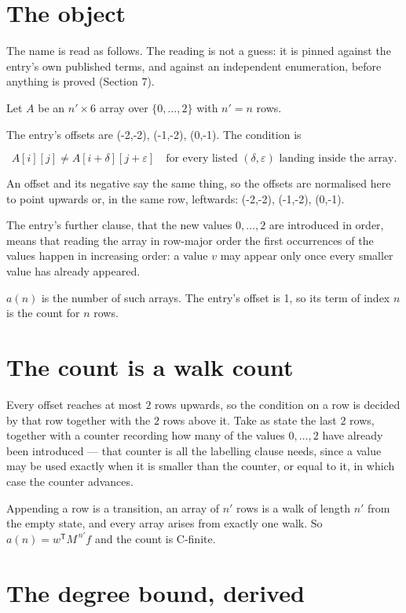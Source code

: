 \documentclass[11pt]{article}
\theoremstyle{definition}
\begin{document}
\section{The object}

The name is read as follows. The reading is not a guess: it is pinned against the entry's own published terms, and against an independent enumeration, before anything is proved (Section 7).

Let $A$ be an $n' \times 6$ array over $\{0,\dots,2\}$ with $n' = n$ rows.

The entry's offsets are (-2,-2), (-1,-2), (0,-1). The condition is

\[A[i][j] \ne A[i{+}\delta][j{+}\varepsilon]\quad\text{for every listed }(\delta,\varepsilon)\text{ landing inside the array.}\]

An offset and its negative say the same thing, so the offsets are normalised here to point upwards or, in the same row, leftwards: (-2,-2), (-1,-2), (0,-1).

The entry's further clause, that the new values $0,\dots,2$ are introduced in order, means that reading the array in row-major order the first occurrences of the values happen in increasing order: a value $v$ may appear only once every smaller value has already appeared.

$a(n)$ is the number of such arrays. The entry's offset is 1, so its term of index $n$ is the count for $n$ rows.

\section{The count is a walk count}

Every offset reaches at most $2$ rows upwards, so the condition on a row is decided by that row together with the $2$ rows above it. Take as state the last $2$ rows, together with a counter recording how many of the values $0,\dots,2$ have already been introduced --- that counter is all the labelling clause needs, since a value may be used exactly when it is smaller than the counter, or equal to it, in which case the counter advances.

Appending a row is a transition, an array of $n'$ rows is a walk of length $n'$ from the empty state, and every array arises from exactly one walk. So $a(n) = w^{\mathsf T}M^{\,n'}f$ and the count is C-finite.

\section{The degree bound, derived}
\end{document}
